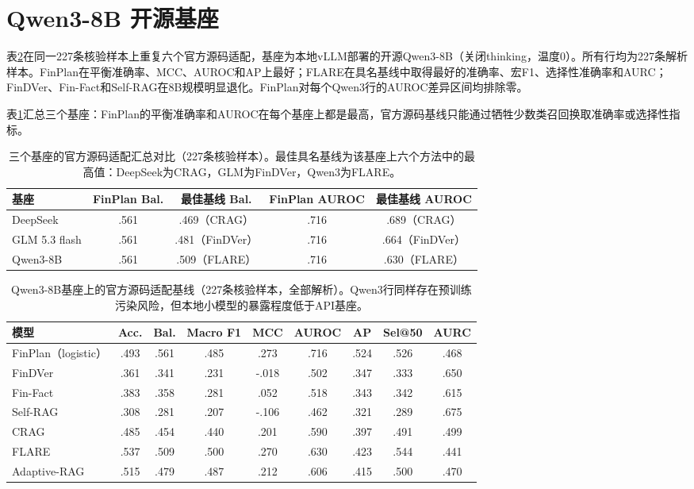 \documentclass[12pt,openany]{ctexbook}
\begin{document}
\section{Qwen3-8B 开源基座}
\label{app:qwen}
表\ref{tab:qwen-zh}在同一227条核验样本上重复六个官方源码适配，基座为本地vLLM部署的开源Qwen3-8B（关闭thinking，温度0）。所有行均为227条解析样本。FinPlan在平衡准确率、MCC、AUROC和AP上最好；FLARE在具名基线中取得最好的准确率、宏F1、选择性准确率和AURC；FinDVer、Fin-Fact和Self-RAG在8B规模明显退化。FinPlan对每个Qwen3行的AUROC差异区间均排除零。\par
表\ref{tab:backbone-zh}汇总三个基座：FinPlan的平衡准确率和AUROC在每个基座上都是最高，官方源码基线只能通过牺牲少数类召回换取准确率或选择性指标。\par
\begin{table}[htbp]
\centering
\caption{三个基座的官方源码适配汇总对比（227条核验样本）。最佳具名基线为该基座上六个方法中的最高值：DeepSeek为CRAG，GLM为FinDVer，Qwen3为FLARE。}
\label{tab:backbone-zh}
\begin{tabular}{lcccc}
\toprule
基座 & FinPlan Bal. & 最佳基线 Bal. & FinPlan AUROC & 最佳基线 AUROC \\
\midrule
DeepSeek & .561 & .469（CRAG） & .716 & .689（CRAG） \\
GLM 5.3 flash & .561 & .481（FinDVer） & .716 & .664（FinDVer） \\
Qwen3-8B & .561 & .509（FLARE） & .716 & .630（FLARE） \\
\bottomrule
\end{tabular}
\end{table}
\begin{table}[htbp]
\centering
\caption{Qwen3-8B基座上的官方源码适配基线（227条核验样本，全部解析）。Qwen3行同样存在预训练污染风险，但本地小模型的暴露程度低于API基座。}
\label{tab:qwen-zh}
\setlength{\tabcolsep}{2pt}
\begin{tabular}{lcccccccc}
\toprule
模型 & Acc. & Bal. & Macro F1 & MCC & AUROC & AP & Sel@50 & AURC \\
\midrule
FinPlan（logistic） & .493 & .561 & .485 & .273 & .716 & .524 & .526 & .468 \\
FinDVer & .361 & .341 & .231 & -.018 & .502 & .347 & .333 & .650 \\
Fin-Fact & .383 & .358 & .281 & .052 & .518 & .343 & .342 & .615 \\
Self-RAG & .308 & .281 & .207 & -.106 & .462 & .321 & .289 & .675 \\
CRAG & .485 & .454 & .440 & .201 & .590 & .397 & .491 & .499 \\
FLARE & .537 & .509 & .500 & .270 & .630 & .423 & .544 & .441 \\
Adaptive-RAG & .515 & .479 & .487 & .212 & .606 & .415 & .500 & .470 \\
\bottomrule
\end{tabular}
\end{table}
\end{document}

